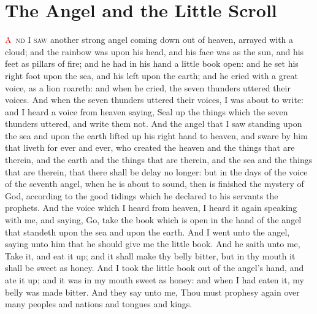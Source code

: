 
\chapter{The Angel and the Little Scroll}
\lettrine[lines=3,slope=-0.5em]{\textcolor{red}{A}}{\ nd I saw} another strong angel coming down out of heaven, arrayed with a cloud; and the rainbow was upon his head, and his face was as the sun, and his feet as pillars of fire; 
 and he had in his hand a little book open: and he set his right foot upon the sea, and his left upon the earth; 
 and he cried with a great voice, as a lion roareth: and when he cried, the seven thunders uttered their voices. 
 And when the seven thunders uttered their voices, I was about to write: and I heard a voice from heaven saying, Seal up the things which the seven thunders uttered, and write them not. 
 And the angel that I saw standing upon the sea and upon the earth lifted up his right hand to heaven, 
 and sware by him that liveth for ever and ever, who created the heaven and the things that are therein, and the earth and the things that are therein, and the sea and the things that are therein, that there shall be delay no longer: 
 but in the days of the voice of the seventh angel, when he is about to sound, then is finished the mystery of God, according to the good tidings which he declared to his servants the prophets. 
 And the voice which I heard from heaven, I heard it again speaking with me, and saying, Go, take the book which is open in the hand of the angel that standeth upon the sea and upon the earth. 
 And I went unto the angel, saying unto him that he should give me the little book. And he saith unto me, Take it, and eat it up; and it shall make thy belly bitter, but in thy mouth it shall be sweet as honey. 
 And I took the little book out of the angel’s hand, and ate it up; and it was in my mouth sweet as honey: and when I had eaten it, my belly was made bitter. 
 And they say unto me, Thou must prophesy again over many peoples and nations and tongues and kings.